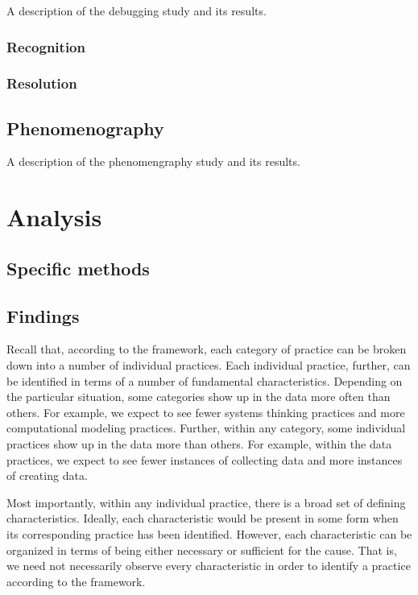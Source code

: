 \documentclass{msuphddissertation}
\begin{document}
\begin{doublespace}
A description of the debugging study and its results.

\subsection{Recognition}

\subsection{Resolution}

\section{Phenomenography}\label{sec:phenom}

A description of the phenomengraphy study and its results.

%
%

\chapter{Analysis}

\section{Specific methods}

\section{Findings}

Recall that, according to the framework, each category of practice can be broken down into a number of individual practices.  Each individual practice, further, can be identified in terms of a number of fundamental characteristics.  Depending on the particular situation, some categories show up in the data more often than others.  For example, we expect to see fewer systems thinking practices and more computational modeling practices.  Further, within any category, some individual practices show up in the data more than others.  For example, within the data practices, we expect to see fewer instances of collecting data and more instances of creating data.

Most importantly, within any individual practice, there is a broad set of defining characteristics.  Ideally, each characteristic would be present in some form when its corresponding practice has been identified.  However, each characteristic can be organized in terms of being either necessary or sufficient for the cause.  That is, we need not necessarily observe every characteristic in order to identify a practice according to the framework.


\end{doublespace}
\end{document}
